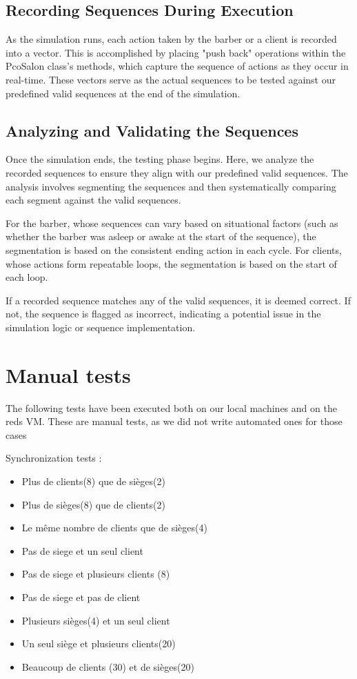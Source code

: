 \documentclass{article}
\begin{document}
    \subsection{Recording Sequences During Execution}

    As the simulation runs, each action taken by the barber or a client is recorded into a vector. This is accomplished by placing "push back" operations within the PcoSalon class's methods, which capture the sequence of actions as they occur in real-time. These vectors serve as the actual sequences to be tested against our predefined valid sequences at the end of the simulation.

    \subsection{Analyzing and Validating the Sequences}

    Once the simulation ends, the testing phase begins. Here, we analyze the recorded sequences to ensure they align with our predefined valid sequences. The analysis involves segmenting the sequences and then systematically comparing each segment against the valid sequences.

    For the barber, whose sequences can vary based on situational factors (such as whether the barber was asleep or awake at the start of the sequence), the segmentation is based on the consistent ending action in each cycle. For clients, whose actions form repeatable loops, the segmentation is based on the start of each loop.

    If a recorded sequence matches any of the valid sequences, it is deemed correct. If not, the sequence is flagged as incorrect, indicating a potential issue in the simulation logic or sequence implementation.


    \section{Manual tests}

    The following tests have been executed both on our local machines and on the reds VM. These are manual tests, as we did not write automated ones for those cases

    Synchronization tests :
    \begin{itemize}
        \item Plus de clients(8) que de sièges(2)
        \item Plus de sièges(8) que de clients(2)
        \item Le même nombre de clients que de sièges(4)
        \item Pas de siege et un seul client
        \item Pas de siege et plusieurs clients (8)
        \item Pas de siege et pas de client
        \item Plusieurs sièges(4) et un seul client
        \item Un seul siège et plusieurs clients(20)
        \item Beaucoup de clients (30) et de sièges(20)
    \end{itemize}
\end{document}
